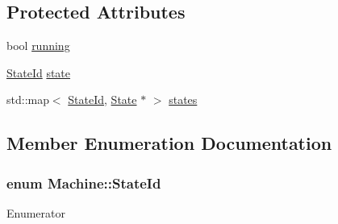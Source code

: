 \subsection*{Protected Attributes}
\begin{DoxyCompactItemize}
\item 
bool \hyperlink{classMachine_aaf4949e30c3e33602e4082c9739d3e37}{running}
\item 
\hyperlink{classMachine_a5fb0c119d231dd1bfe1dd2c9ca533520}{State\+Id} \hyperlink{classMachine_a76e105e6a1e86eb11af49ca4c9a9ead9}{state}
\item 
std\+::map$<$ \hyperlink{classMachine_a5fb0c119d231dd1bfe1dd2c9ca533520}{State\+Id}, \hyperlink{classState}{State} $\ast$ $>$ \hyperlink{classMachine_ab6245c4e251df9deaff8b6fa99f7a6e5}{states}
\end{DoxyCompactItemize}


\subsection{Member Enumeration Documentation}
\subsubsection[{\texorpdfstring{State\+Id}{StateId}}]{\setlength{\rightskip}{0pt plus 5cm}enum {\bf Machine\+::\+State\+Id}\hspace{0.3cm}{\ttfamily [strong]}}\hypertarget{classMachine_a5fb0c119d231dd1bfe1dd2c9ca533520}{}\label{classMachine_a5fb0c119d231dd1bfe1dd2c9ca533520}
\begin{Desc}
\item[Enumerator]\par
\begin{description}
\item[{\em 
M\+A\+I\+N\+M\+E\+NU\hypertarget{classMachine_a5fb0c119d231dd1bfe1dd2c9ca533520a3287971e79b4dca11067ed287847c1e6}{}\label{classMachine_a5fb0c119d231dd1bfe1dd2c9ca533520a3287971e79b4dca11067ed287847c1e6}
}]\item[{\em 
L\+O\+AD\hypertarget{classMachine_a5fb0c119d231dd1bfe1dd2c9ca533520a615d2885ef7576cedd9aafbb2578f028}{}\label{classMachine_a5fb0c119d231dd1bfe1dd2c9ca533520a615d2885ef7576cedd9aafbb2578f028}
}]\item[{\em 
G\+A\+ME\hypertarget{classMachine_a5fb0c119d231dd1bfe1dd2c9ca533520a4504e1ed59cd9732b8a844e5424e6f13}{}\label{classMachine_a5fb0c119d231dd1bfe1dd2c9ca533520a4504e1ed59cd9732b8a844e5424e6f13}
}]\end{description}
\end{Desc}

